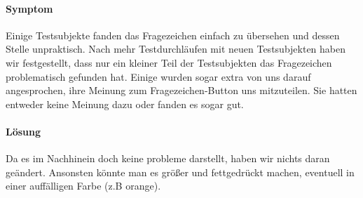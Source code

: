 \paragraph{Symptom}
Einige Testsubjekte fanden das Fragezeichen einfach zu übersehen und dessen Stelle unpraktisch. Nach mehr Testdurchläufen mit neuen Testsubjekten haben wir festgestellt, dass nur ein kleiner Teil der Testsubjekten das Fragezeichen problematisch gefunden hat. Einige wurden sogar extra von uns darauf angesprochen, ihre Meinung zum Fragezeichen-Button uns mitzuteilen. Sie hatten entweder keine Meinung dazu oder fanden es sogar gut.

\paragraph{Lösung}
Da es im Nachhinein doch keine probleme darstellt, haben wir nichts daran geändert. Ansonsten könnte man es größer und fettgedrückt machen, eventuell in einer auffälligen Farbe (z.B orange).